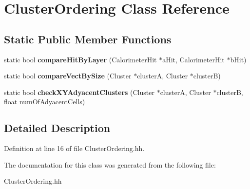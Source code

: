 \section{ClusterOrdering Class Reference}
\label{classClusterOrdering}
\subsection*{Static Public Member Functions}
\begin{DoxyCompactItemize}
\item 
static bool {\bfseries compareHitByLayer} (CalorimeterHit $\ast$aHit, CalorimeterHit $\ast$bHit)\label{classClusterOrdering_a98385e73ef0f15d8093401c950dc235d}

\item 
static bool {\bfseries compareVectBySize} (Cluster $\ast$clusterA, Cluster $\ast$clusterB)\label{classClusterOrdering_a65fe903f58c543c843b84c2d7ee17d05}

\item 
static bool {\bfseries checkXYAdyacentClusters} (Cluster $\ast$clusterA, Cluster $\ast$clusterB, float numOfAdyacentCells)\label{classClusterOrdering_a5f63b93db02d903b457eb1a56da2d49a}

\end{DoxyCompactItemize}


\subsection{Detailed Description}


Definition at line 16 of file ClusterOrdering.hh.

The documentation for this class was generated from the following file:\begin{DoxyCompactItemize}
\item 
ClusterOrdering.hh\end{DoxyCompactItemize}
